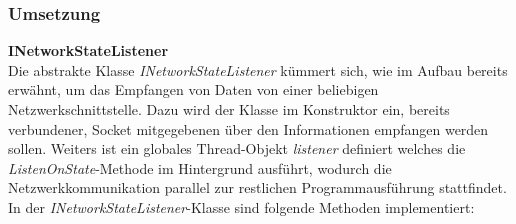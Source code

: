 \subsubsection{Umsetzung}
\textbf{INetworkStateListener}\\
Die abstrakte Klasse \textit{INetworkStateListener} kümmert sich, wie im Aufbau bereits erwähnt, um das Empfangen von Daten von einer beliebigen Netzwerkschnittstelle. Dazu wird der Klasse im Konstruktor ein, bereits verbundener, Socket mitgegebenen über den Informationen empfangen werden sollen. Weiters ist ein globales Thread-Objekt \textit{listener} definiert welches die \textit{ListenOnState}-Methode im Hintergrund ausführt, wodurch die Netzwerkkommunikation parallel zur restlichen Programmausführung stattfindet.\\
In der \textit{INetworkStateListener}-Klasse sind folgende Methoden implementiert:

